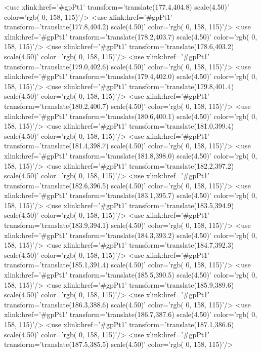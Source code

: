 	<use xlink:href='#gpPt1' transform='translate(177.4,404.8) scale(4.50)' color='rgb(  0, 158, 115)'/>
	<use xlink:href='#gpPt1' transform='translate(177.8,404.2) scale(4.50)' color='rgb(  0, 158, 115)'/>
	<use xlink:href='#gpPt1' transform='translate(178.2,403.7) scale(4.50)' color='rgb(  0, 158, 115)'/>
	<use xlink:href='#gpPt1' transform='translate(178.6,403.2) scale(4.50)' color='rgb(  0, 158, 115)'/>
	<use xlink:href='#gpPt1' transform='translate(179.0,402.6) scale(4.50)' color='rgb(  0, 158, 115)'/>
	<use xlink:href='#gpPt1' transform='translate(179.4,402.0) scale(4.50)' color='rgb(  0, 158, 115)'/>
	<use xlink:href='#gpPt1' transform='translate(179.8,401.4) scale(4.50)' color='rgb(  0, 158, 115)'/>
	<use xlink:href='#gpPt1' transform='translate(180.2,400.7) scale(4.50)' color='rgb(  0, 158, 115)'/>
	<use xlink:href='#gpPt1' transform='translate(180.6,400.1) scale(4.50)' color='rgb(  0, 158, 115)'/>
	<use xlink:href='#gpPt1' transform='translate(181.0,399.4) scale(4.50)' color='rgb(  0, 158, 115)'/>
	<use xlink:href='#gpPt1' transform='translate(181.4,398.7) scale(4.50)' color='rgb(  0, 158, 115)'/>
	<use xlink:href='#gpPt1' transform='translate(181.8,398.0) scale(4.50)' color='rgb(  0, 158, 115)'/>
	<use xlink:href='#gpPt1' transform='translate(182.2,397.2) scale(4.50)' color='rgb(  0, 158, 115)'/>
	<use xlink:href='#gpPt1' transform='translate(182.6,396.5) scale(4.50)' color='rgb(  0, 158, 115)'/>
	<use xlink:href='#gpPt1' transform='translate(183.1,395.7) scale(4.50)' color='rgb(  0, 158, 115)'/>
	<use xlink:href='#gpPt1' transform='translate(183.5,394.9) scale(4.50)' color='rgb(  0, 158, 115)'/>
	<use xlink:href='#gpPt1' transform='translate(183.9,394.1) scale(4.50)' color='rgb(  0, 158, 115)'/>
	<use xlink:href='#gpPt1' transform='translate(184.3,393.2) scale(4.50)' color='rgb(  0, 158, 115)'/>
	<use xlink:href='#gpPt1' transform='translate(184.7,392.3) scale(4.50)' color='rgb(  0, 158, 115)'/>
	<use xlink:href='#gpPt1' transform='translate(185.1,391.4) scale(4.50)' color='rgb(  0, 158, 115)'/>
	<use xlink:href='#gpPt1' transform='translate(185.5,390.5) scale(4.50)' color='rgb(  0, 158, 115)'/>
	<use xlink:href='#gpPt1' transform='translate(185.9,389.6) scale(4.50)' color='rgb(  0, 158, 115)'/>
	<use xlink:href='#gpPt1' transform='translate(186.3,388.6) scale(4.50)' color='rgb(  0, 158, 115)'/>
	<use xlink:href='#gpPt1' transform='translate(186.7,387.6) scale(4.50)' color='rgb(  0, 158, 115)'/>
	<use xlink:href='#gpPt1' transform='translate(187.1,386.6) scale(4.50)' color='rgb(  0, 158, 115)'/>
	<use xlink:href='#gpPt1' transform='translate(187.5,385.5) scale(4.50)' color='rgb(  0, 158, 115)'/>
